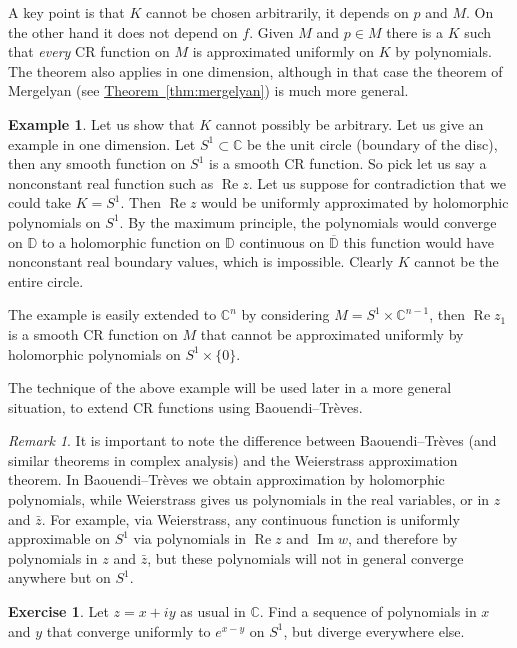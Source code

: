 \documentclass[12pt,openany]{book}
\renewcommand{\Re}{\operatorname{Re}}
\renewcommand{\Im}{\operatorname{Im}}
\newcommand{\C}{{\mathbb{C}}}
\newcommand{\D}{{\mathbb{D}}}
\theoremstyle{plain}
\theoremstyle{remark}
\newtheorem{remark}[thm]{Remark}
\theoremstyle{definition}
\newenvironment{exbox}{%
    \def\FrameCommand{\vrule width 1pt \relax\hspace {10pt}}%
    \MakeFramed {\advance \hsize -\width \FrameRestore }%
}{%
    \endMakeFramed
}
\theoremstyle{exercise}
\newtheorem{exercise}{Exercise}[section]
\theoremstyle{example}
\newtheorem{example}[thm]{Example}
\newcommand{\thmref}[1]{\hyperref[#1]{Theorem~\ref*{#1}}}
\begin{document}
A key point is that $K$ cannot be chosen arbitrarily, it depends on $p$ and $M$.
On the other hand it does not depend on $f$.  Given $M$ and $p \in M$
there is a $K$ such that \emph{every} CR function on $M$ is approximated
uniformly on $K$ by polynomials.  The theorem also applies in one
dimension, although in that case the 
theorem of Mergelyan
(see \thmref{thm:mergelyan}) is much more general.

\begin{example}
Let us show that $K$ cannot possibly be arbitrary.  Let us give an example
in one dimension.  Let $S^1 \subset \C$ be the unit circle (boundary of the disc),
then any smooth function on $S^1$ is a smooth CR function.  So pick let us
say a nonconstant real function such as $\Re z$.  Let us suppose for
contradiction that we could take $K = S^1$.  Then $\Re z$ would be uniformly
approximated by holomorphic polynomials on $S^1$.  By the maximum principle, the
polynomials would converge on $\D$ to a holomorphic function on $\D$
continuous on $\overline{\D}$ this function would have nonconstant real boundary values,
which is impossible.  Clearly $K$ cannot be the entire circle.

The example is easily extended to $\C^n$
by considering 
$M = S^1 \times \C^{n-1}$, then $\Re z_1$ is a smooth CR function on $M$ that cannot be
approximated uniformly by holomorphic polynomials on $S^1 \times \{ 0 \}$.
\end{example}

The technique of the above example will be used later in a more general
situation, to extend CR functions using Baouendi--Tr{\`e}ves.

\begin{remark}
It is important to note the difference
between Baouendi--Tr{\`e}ves (and similar theorems
in complex analysis)
and the Weierstrass approximation theorem.  In Baouendi--Tr{\`e}ves we obtain
approximation by holomorphic polynomials, while Weierstrass gives us
polynomials in the real variables, or in $z$ and $\bar{z}$.  For example,
via Weierstrass, any continuous function is uniformly approximable on $S^1$ via polynomials
in $\Re z$ and $\Im w$, and therefore by polynomials in $z$ and $\bar{z}$,
but these polynomials will not in general converge anywhere but on $S^1$.
\end{remark}

\begin{exbox}
\begin{exercise}
Let $z=x+iy$ as usual in $\C$.
Find a sequence of polynomials in $x$ and $y$ that converge uniformly to $e^{x-y}$ on $S^1$,
but diverge everywhere else.
\end{exercise}
\end{exbox}
\end{document}
